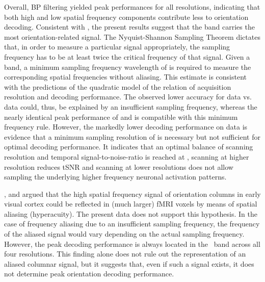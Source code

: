 Overall, BP filtering yielded peak performances for all resolutions, indicating
that both high and low spatial frequency components contribute less to
orientation decoding. Consistent with \citet{alink_2013}, the present results
suggest that the  band carries the most orientation-related
signal. The Nyquist-Shannon Sampling Theorem dictates that, in order to measure
a particular signal appropriately, the sampling frequency has to be at least
twice the critical frequency of that signal. Given a  band, a
minimum sampling frequency wavelength of  is required to
measure the corresponding spatial frequencies without aliasing. This estimate
is consistent with the predictions of the quadratic model of the relation of
acquisition resolution and decoding performance. The observed lower accuracy
for  data vs.~ data could, thus, be explained by an insufficient
sampling frequency, whereas the nearly identical peak performance of 
and  is compatible with this minimum frequency rule. However, the
markedly lower decoding performance on  data is evidence that a minimum
sampling resolution of  is necessary but not sufficient for
optimal decoding performance. It indicates that an optimal balance of scanning
resolution and temporal signal-to-noise-ratio is reached at ,
scanning at higher resolution reduces tSNR and scanning at lower resolutions
does not allow sampling the underlying higher frequency neuronal activation
patterns.


\citet{alink_2013}, \citet{gardner_2010} and \citet{kriegeskorte_2010} argued
that the high spatial frequency signal of orientation columns in early visual
cortex could be reflected in (much larger) fMRI voxels by means of spatial
aliasing (hyperacuity). The present data does not support this hypothesis. In
the case of frequency aliasing due to an insufficient sampling frequency, the
frequency of the aliased signal would vary depending on the actual sampling
frequency.  However, the peak decoding performance is always located in the
\bandofinterest\ band across all four resolutions. This finding alone does not
rule out the representation of an aliased columnar signal,
but it suggests that, even if such a signal exists, it does not determine peak
orientation decoding performance.

